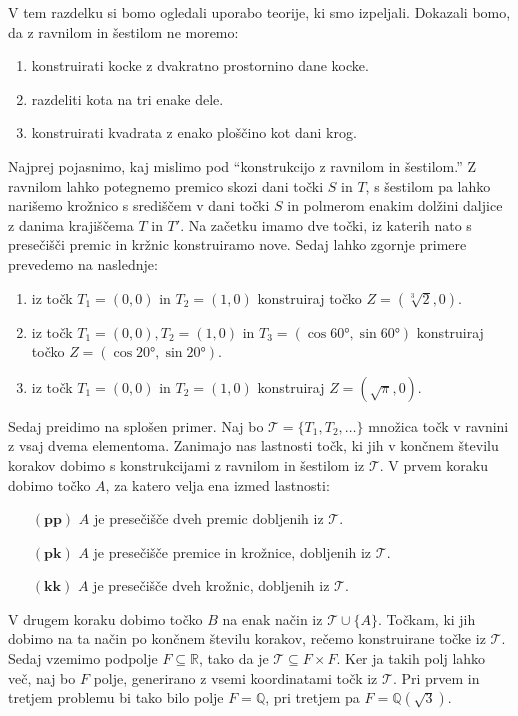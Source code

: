 \documentclass[10pt, a4paper]{article}
\newcommand{\Q}{\mathbb {Q}}
\newcommand{\R}{\mathbb {R}}
\begin{document}
V tem razdelku si bomo ogledali uporabo teorije, ki smo izpeljali. Dokazali bomo, da z ravnilom in šestilom ne moremo:
\begin{enumerate}
  \item konstruirati kocke z dvakratno prostornino dane kocke.
  \item razdeliti kota na tri enake dele.
  \item konstruirati kvadrata z enako ploščino kot dani krog.
\end{enumerate}
Najprej pojasnimo, kaj mislimo pod "`konstrukcijo z ravnilom in šestilom."'
Z ravnilom lahko potegnemo premico skozi dani točki $S$ in $T$, s šestilom pa lahko narišemo krožnico 
s središčem v dani točki $S$ in polmerom enakim dolžini daljice z danima krajiščema $T$ in $T'$.
Na začetku imamo dve točki, iz katerih nato s presečišči premic in kržnic konstruiramo nove.
Sedaj lahko zgornje primere prevedemo na naslednje:
\begin{enumerate}
  \item iz točk $T_1= (0, 0)$ in $T_2 = (1, 0)$ konstruiraj točko $Z = (\sqrt[3]{2}, 0)$.
  \item iz točk $T_1 = (0, 0), T_2 = (1, 0)$ in $T_3 = (\cos \ang{60}, \sin \ang{60})$ konstruiraj točko $Z = (\cos \ang{20}, \sin \ang{20})$.
  \item iz točk $T_1 = (0, 0)$ in $T_2 = (1, 0)$ konstruiraj $Z = (\sqrt{\pi}, 0).$
\end{enumerate}
Sedaj preidimo na splošen primer. Naj bo $\mathcal{T} = \{T_1, T_2, \dots\}$ množica točk v ravnini 
z vsaj dvema elementoma. Zanimajo nas lastnosti točk, ki jih v končnem številu korakov dobimo s konstrukcijami z ravnilom in šestilom iz $\mathcal{T}$.
V prvem koraku dobimo točko $A$, za katero velja ena izmed lastnosti:
\begin{itemize}
  \item[$\mathbf{(pp)}$] $A$ je presečišče dveh premic dobljenih iz $\mathcal{T}$.
  \item[$\mathbf{(pk)}$] $A$ je presečišče premice in krožnice, dobljenih iz $\mathcal{T}$.
  \item[$\mathbf{(kk)}$] $A$ je presečišče dveh krožnic, dobljenih iz $\mathcal{T}$.
\end{itemize}
V drugem koraku dobimo točko $B$ na enak način iz $\mathcal{T} \cup \{A\}$.
Točkam, ki jih dobimo na ta način po končnem številu korakov, rečemo konstruirane točke iz $\mathcal{T}$.
Sedaj vzemimo podpolje $F \subseteq \R$, tako da je $\mathcal{T} \subseteq F \times F$.
Ker ja takih polj lahko več, naj bo $F$ polje, generirano z vsemi koordinatami točk iz $\mathcal{T}$.
Pri prvem in tretjem problemu bi tako bilo polje $F = \Q$, pri tretjem pa $F = \Q (\sqrt{3})$.
\end{document}
